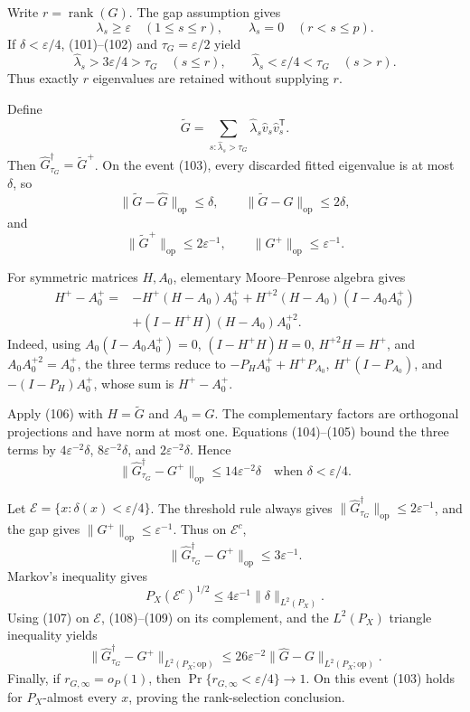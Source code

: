 Write \(r=\operatorname{rank}(G)\).  The gap assumption gives
\[
 \lambda_s\geq\varepsilon\quad(1\leq s\leq r),\qquad
 \lambda_s=0\quad(r<s\leq p). \tag{102}
\]
If \(\delta<\varepsilon/4\), (101)--(102) and \(\tau_G=\varepsilon/2\) yield
\[
 \widehat\lambda_s>3\varepsilon/4>\tau_G\quad(s\leq r),\qquad
 \widehat\lambda_s<\varepsilon/4<\tau_G\quad(s>r). \tag{103}
\]
Thus exactly \(r\) eigenvalues are retained without supplying \(r\).

Define
\[
 \widetilde G=\sum_{s:\widehat\lambda_s>\tau_G}
 \widehat\lambda_s\widehat v_s\widehat v_s^{\mathsf T}.
\]
Then \(\widehat G_{\tau_G}^{\dagger}=\widetilde G^+\).  On the event (103), every discarded fitted eigenvalue is at most \(\delta\), so
\[
 \|\widetilde G-\widehat G\|_{\mathrm{op}}\leq\delta,\qquad
 \|\widetilde G-G\|_{\mathrm{op}}\leq2\delta, \tag{104}
\]
and
\[
 \|\widetilde G^+\|_{\mathrm{op}}\leq2\varepsilon^{-1},\qquad
 \|G^+\|_{\mathrm{op}}\leq\varepsilon^{-1}. \tag{105}
\]

For symmetric matrices \(H,A_0\), elementary Moore--Penrose algebra gives
\[
\begin{aligned}
 H^+-A_0^+
={}&-H^+(H-A_0)A_0^+
 +H^{+2}(H-A_0)(I-A_0A_0^+)\\
&+(I-H^+H)(H-A_0)A_0^{+2}. \tag{106}
\end{aligned}
\]
Indeed, using \(A_0(I-A_0A_0^+)=0\), \((I-H^+H)H=0\),
\(H^{+2}H=H^+\), and \(A_0A_0^{+2}=A_0^+\), the three terms reduce to
\(-P_HA_0^++H^+P_{A_0}\), \(H^+(I-P_{A_0})\), and
\(-(I-P_H)A_0^+\), whose sum is \(H^+-A_0^+\).

Apply (106) with \(H=\widetilde G\) and \(A_0=G\).  The complementary factors are orthogonal projections and have norm at most one.  Equations (104)--(105) bound the three terms by \(4\varepsilon^{-2}\delta\), \(8\varepsilon^{-2}\delta\), and \(2\varepsilon^{-2}\delta\).  Hence
\[
 \|\widehat G_{\tau_G}^{\dagger}-G^+\|_{\mathrm{op}}
 \leq14\varepsilon^{-2}\delta
 \quad\text{when }\delta<\varepsilon/4. \tag{107}
\]

Let \(\mathcal E=\{x:\delta(x)<\varepsilon/4\}\).  The threshold rule always gives
\(\|\widehat G_{\tau_G}^{\dagger}\|_{\mathrm{op}}\leq2\varepsilon^{-1}\), and the gap gives \(\|G^+\|_{\mathrm{op}}\leq\varepsilon^{-1}\).  Thus on \(\mathcal E^c\),
\[
 \|\widehat G_{\tau_G}^{\dagger}-G^+\|_{\mathrm{op}}
 \leq3\varepsilon^{-1}. \tag{108}
\]
Markov's inequality gives
\[
 P_X(\mathcal E^c)^{1/2}
 \leq4\varepsilon^{-1}\|\delta\|_{L^2(P_X)}. \tag{109}
\]
Using (107) on \(\mathcal E\), (108)--(109) on its complement, and the \(L^2(P_X)\) triangle inequality yields
\[
 \|\widehat G_{\tau_G}^{\dagger}-G^+\|_{L^2(P_X;\mathrm{op})}
 \leq26\varepsilon^{-2}
 \|\widehat G-G\|_{L^2(P_X;\mathrm{op})}. \tag{110}
\]
Finally, if \(r_{G,\infty}=o_P(1)\), then
\(\Pr\{r_{G,\infty}<\varepsilon/4\}\to1\).  On this event (103) holds for \(P_X\)-almost every \(x\), proving the rank-selection conclusion.

